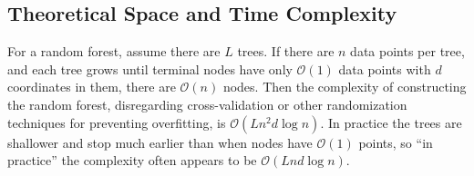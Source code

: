 \documentclass{article} %
\providecommand{\mc}[1]{\mathcal{#1}}
\begin{document}






\subsection{Theoretical Space and Time Complexity}

For a random forest, assume there are $L$ trees.  
If there are $n$ data points per tree, and each tree grows until terminal nodes have only $\mc O(1)$ data points with $d$ coordinates in them, there are $\mc O(n)$ nodes.
Then the complexity of constructing the random forest, disregarding cross-validation or other randomization techniques for preventing overfitting, is $\mc O(Ln^2d\log n)$. In practice the trees are shallower and stop much earlier than when nodes have $\mc O(1)$ points, so ``in practice'' the complexity often appears to be $\mc O(Lnd\log n)$.
\end{document}
